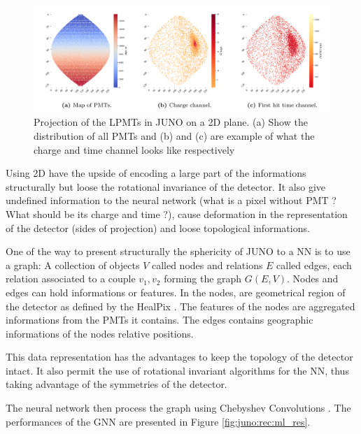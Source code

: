 \documentclass[../main.tex]{subfiles}
\begin{document}
\begin{figure}[ht]
  \centering
  \includegraphics[width=\linewidth]{images/juno/reco/cnn_proj.png}
  \caption{Projection of the LPMTs in JUNO on a 2D plane. (a) Show the distribution of all PMTs and (b) and (c) are example of what the charge and time channel looks like respectively}
  \label{fig:juno:rec:cnn_proj}
\end{figure}

Using 2D have the upside of encoding a large part of the informations structurally but loose the rotational invariance of the detector. It also give undefined information to the neural network (what is a pixel without PMT ? What should be its charge and time ?), cause deformation in the representation of the detector (sides of projection) and loose topological informations.

One of the way to present structurally the sphericity of JUNO to a NN is to use a graph: A collection of objects $V$ called nodes and relations $E$ called edges, each relation associated to a couple ${v_1, v_2}$ forming the graph $G(E, V)$. Nodes and edges can hold informations or features. In \cite{qian_vertex_2021} the nodes, are geometrical region of the detector as defined by the HealPix \cite{gorski_healpix_2005-1}. The features of the nodes are aggregated informations from the PMTs it contains. The edges contains geographic informations of the nodes relative positions.

This data representation has the advantages to keep the topology of the detector intact. It also permit the use of rotational invariant algorithms for the NN, thus taking advantage of the symmetries of the detector.

The neural network then process the graph using Chebyshev Convolutions \cite{defferrard_convolutional_2017}. The performances of the GNN are presented in Figure \ref{fig:juno:rec:ml_res}.
\end{document}

